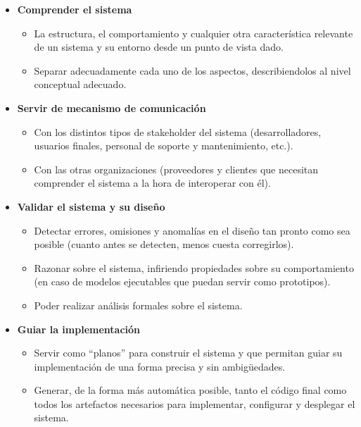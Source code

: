 \begin{itemize}
	\item \textbf{Comprender el sistema}
		\begin{itemize}
			\item La estructura, el comportamiento y cualquier otra característica relevante de un sistema y su entorno desde un punto de vista dado.
			
			\item Separar adecuadamente cada uno de los aspectos, describiendolos al nivel conceptual adecuado.
		\end{itemize}
	\item \textbf{Servir de mecanismo de comunicación}
		\begin{itemize}
			\item Con los distintos tipos de stakeholder del sistema (desarrolladores, usuarios finales, personal de soporte y mantenimiento, etc.).
			
			\item Con las otras organizaciones (proveedores y clientes que necesitan comprender el sistema a la hora de interoperar con él).
		\end{itemize}	
	\item \textbf{Validar el sistema y su diseño}
		\begin{itemize}
			\item Detectar errores, omisiones y anomalías en el diseño tan pronto como sea posible (cuanto antes se detecten, menos cuesta corregirlos).
			
			\item Razonar sobre el sistema, infiriendo propiedades sobre su comportamiento (en caso de modelos ejecutables que puedan servir como prototipos).
			
			\item Poder realizar análisis formales sobre el sistema.
		\end{itemize}		
	\item \textbf{Guiar la implementación}
		\begin{itemize}
			\item Servir como ``planos'' para construir el sistema y que permitan guiar su implementación de una forma precisa y sin ambigüedades.
			
			\item Generar, de la forma más automática posible, tanto el código final como todos los artefactos necesarios para implementar, configurar y desplegar el sistema.
		\end{itemize}	
	
\end{itemize}

